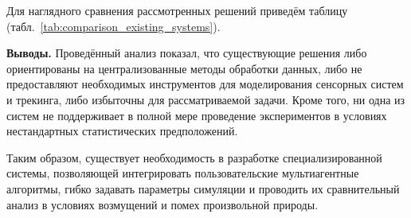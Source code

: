 Для наглядного сравнения рассмотренных решений приведём таблицу
(табл.~\ref{tab:comparison_existing_systems}).

\begin{table}[h]
    \centering
    \caption{Сравнение существующих решений}
    \label{tab:comparison_existing_systems}
    \renewcommand{\arraystretch}{1.8} 
    \end{table}

\vspace{0.5em}

\textbf{Выводы.}
Проведённый анализ показал, что существующие решения либо ориентированы
на централизованные методы обработки данных, либо не предоставляют
необходимых инструментов для моделирования сенсорных систем и трекинга,
либо избыточны для рассматриваемой задачи. Кроме того, ни одна из систем
не поддерживает в полной мере проведение экспериментов в условиях
нестандартных статистических предположений.

Таким образом, существует необходимость в разработке специализированной
системы, позволяющей интегрировать пользовательские мультиагентные алгоритмы,
гибко задавать параметры симуляции и проводить их сравнительный анализ
в условиях возмущений и помех произвольной природы.

